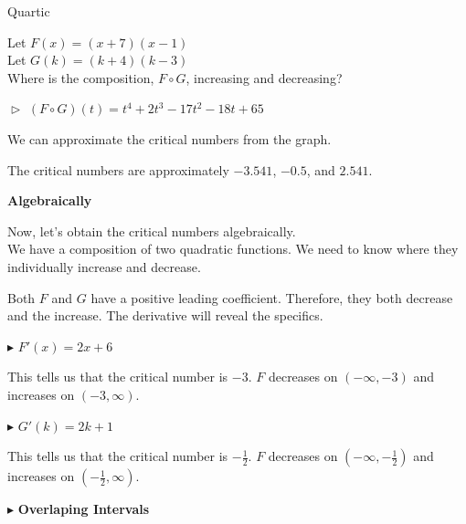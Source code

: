 \documentclass{ximera}
\begin{document}
\begin{example}   Quartic



Let $F(x) = (x+7)(x-1)$ \\


Let $G(k) = (k+4)(k-3)$ \\



Where is the composition, $F \circ G$, increasing and decreasing?


$\vartriangleright$   $(F \circ G)(t) = t^4 +2 t^3 -17 t^2 - 18 t + 65$





We can approximate the critical numbers from the graph.



\begin{center}
\end{center}


The critical numbers are approximately $-3.541$, $-0.5$, and $2.541$.


\textbf{\textcolor{red!70!black}{Algebraically}}


Now, let's obtain the critical numbers algebraically. \\


We have a composition of two quadratic functions.  We need to know where they individually increase and decrease.

Both $F$ and $G$ have a positive leading coefficient.  Therefore, they both decrease and the increase. The derivative will reveal the specifics.



$\blacktriangleright$  $F'(x) = 2x + 6$

This tells us that the critical number is $-3$.  $F$ decreases on $(-\infty, -3)$ and increases on $(-3, \infty)$.

$\blacktriangleright$  $G'(k) = 2k + 1$

This tells us that the critical number is $-\frac{1}{2}$.  $F$ decreases on $(-\infty, -\frac{1}{2})$ and increases on $(-\frac{1}{2}, \infty)$.







\textbf{\textcolor{red!70!darkgray}{$\blacktriangleright$}} \textbf{\textcolor{purple!85!blue}{Overlaping Intervals}}  \\




\end{example}
\end{document}
